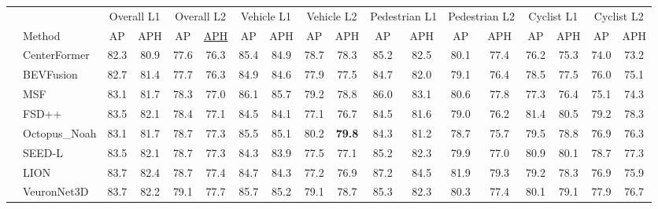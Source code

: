 \begin{table}[]
    \centering
    \footnotesize
    \begin{tabular}{@{}llcccccccccccccccc@{}}
    \toprule
    &               & \multicolumn{2}{c}{Overall L1} & \multicolumn{2}{c}{Overall L2} & \multicolumn{2}{c}{Vehicle L1} & \multicolumn{2}{c}{Vehicle L2} & \multicolumn{2}{c}{Pedestrian L1} & \multicolumn{2}{c}{Pedestrian L2} & \multicolumn{2}{c}{Cyclist L1} & \multicolumn{2}{c}{Cyclist L2} \\ 
    \cmidrule(lr){3-4} \cmidrule(lr){5-6} \cmidrule(lr){7-8} \cmidrule(lr){9-10} \cmidrule(lr){11-12} \cmidrule(lr){13-14} \cmidrule(lr){15-16} \cmidrule(lr){17-18}
    & Method                                         & AP   & APH  & AP   & \underline{APH}  & AP   & APH  & AP   & APH  & AP   & APH  & AP   & APH  & AP   & APH  & AP   & APH  \\ \midrule
    & CenterFormer~\cite{zhou2022centerformer}       & 82.3 & 80.9 & 77.6 & 76.3 & 85.4 & 84.9 & 78.7 & 78.3 & 85.2 & 82.5 & 80.1 & 77.4 & 76.2 & 75.3 & 74.0 & 73.2 \\
    & BEVFusion~\cite{liu2023bevfusion}              & 82.7 & 81.4 & 77.7 & 76.3 & 84.9 & 84.6 & 77.9 & 77.5 & 84.7 & 82.0 & 79.1 & 76.4 & 78.5 & 77.5 & 76.0 & 75.1 \\
    & MSF~\cite{he2023msf}                           & 83.1 & 81.7 & 78.3 & 77.0 & 86.1 & 85.7 & 79.2 & 78.8 & 86.0 & 83.1 & 80.6 & 77.8 & 77.3 & 76.4 & 75.1 & 74.3 \\
    & FSD++~\cite{fan2023super}                      & 83.5 & 82.1 & 78.4 & 77.1 & 84.5 & 84.1 & 77.1 & 76.7 & 84.5 & 81.6 & 79.0 & 76.2 & 81.4 & 80.5 & 79.2 & 78.3 \\
    & Octopus\_Noah                                  & 83.1 & 81.7 & 78.7 & 77.3 & 85.5 & 85.1 & 80.2 & \textbf{79.8} & 84.3 & 81.2 & 78.7 & 75.7 & 79.5 & 78.8 & 76.9 & 76.3 \\
    & SEED-L~\cite{liu2024seed}                      & 83.5 & 82.1 & 78.7 & 77.3 & 84.3 & 83.9 & 77.5 & 77.1 & 85.2 & 82.3 & 79.9 & 77.0 & 80.9 & 80.1 & 78.7 & 77.3 \\
    & LION~\cite{liu2024lion}                        & 83.7 & 82.4 & 78.7 & 77.4 & 84.7 & 84.3 & 77.2 & 76.9 & 87.2 & 84.5 & 81.9 & 79.3 & 79.2 & 78.3 & 76.9 & 75.9 \\
    & VeuronNet3D                                    & 83.7 & 82.2 & 79.1 & 77.7 & 85.7 & 85.2 & 79.1 & 78.7 & 85.3 & 82.3 & 80.3 & 77.4 & 80.1 & 79.1 & 77.9 & 76.7 \\

\end{tabular}
\end{table}
